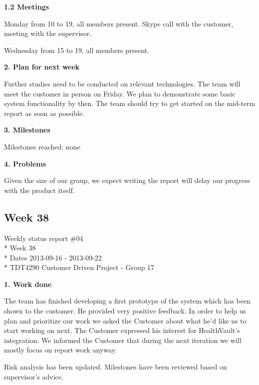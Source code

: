 \textbf{1.2 Meetings}

Monday
from 10 to 19, all members present.
Skype call with the customer, meeting with the supervisor.

Wednesday
from 15 to 19, all members present.

\textbf{2. Plan for next week}

Further studies need to be conducted on relevant technologies. 
The team will meet the customer in person on Friday. 
We plan to demonstrate some basic system functionality by then. 
The team should try to get started on the mid-term report as soon as possible.

\textbf{3. Milestones}

Milestones reached: none

\textbf{4. Problems}

Given the size of our group, we expect writing the report will delay our progress with the product itself.





\iffalse

\newpage
\subsection{Week 38}

\begin{center}
Weekly status report \#04\\*
Week 38 \\*
Dates 2013-09-16 - 2013-09-22 \\*
TDT4290 Customer Driven Project - Group 17
\end{center}

\textbf{1. Work done}

The team has finished developing a first prototype of the system which has been shown to the customer. 
He provided very positive feedback.
In order to help us plan and prioritize our work we asked the Customer about what he’d like us to start working on next. 
The Customer expressed his interest for HealthVault's integration. 
We informed the Customer that during the next iteration we will mostly focus on report work anyway.

Risk analysis has been updated. Milestones have been reviewed based on supervisor’s advice.

